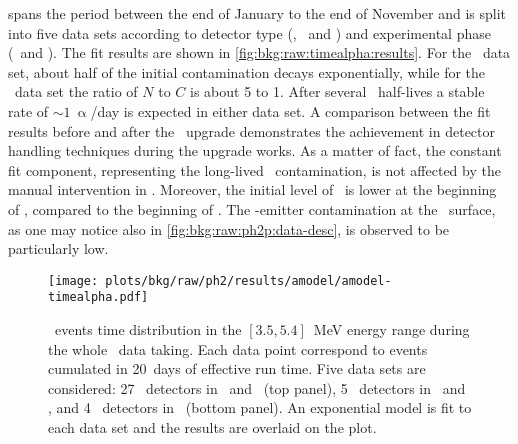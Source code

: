 spans the period between the end of January  to the end of November  and
is split into five data sets according to detector type (\bege, \scoax\ and \icoax) and
experimental phase (\phaseone\ and \phasetwop).
\newpar
The fit results are shown in \autoref{fig:bkg:raw:timealpha:results}. For the \bege\ data
set, about half of the initial contamination decays exponentially, while for the \scoax\
data set the ratio of $N$ to $C$ is about 5 to 1. After several \Po\ half-lives a stable
rate of $\sim1~\upalpha$/day is expected in either data set. A comparison between the fit
results before and after the \phasetwop\ upgrade demonstrates the achievement in detector
handling techniques during the upgrade works. As a matter of fact, the constant fit
component, representing the long-lived \Po\ contamination, is not affected by the manual
intervention in \yr{2018}. Moreover, the initial level of \Pbl\ is lower at the beginning
of \phasetwop, compared to the beginning of \phasetwo. The \a-emitter contamination at the
\icoax\ surface, as one may notice also in \cref{fig:bkg:raw:ph2p:data-desc}, is observed
to be particularly low.

\begin{figure}
  \centering
  \texttt{[image: plots/bkg/raw/ph2/results/amodel/amodel-timealpha.pdf]}
  \caption{%
    \a\ events time distribution in the $[3.5,5.4]$~MeV energy range during the whole
    \phasetwo\ data taking. Each data point correspond to events cumulated in 20~days of
    effective run time. Five data sets are considered: 27 \bege\ detectors in \phasetwo\ and
    \phasetwop\ (top panel), 5 \scoax\ detectors in \phasetwo\ and \phasetwop, and 4
    \icoax\ detectors in \phasetwop\ (bottom panel). An exponential model is fit to each
    data set and the results are overlaid on the plot.
  }\label{fig:bkg:raw:timealpha:results}
\end{figure}

